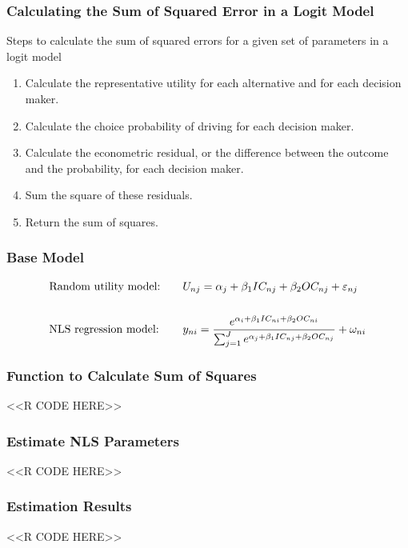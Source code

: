 \documentclass{beamer}
\begin{document}
\begin{frame}\frametitle{Calculating the Sum of Squared Error in a Logit Model}
    Steps to calculate the sum of squared errors for a given set of parameters in a logit model
    \begin{enumerate}
        \item Calculate the representative utility for each alternative and for each decision maker.
        \item Calculate the choice probability of driving for each decision maker.
        \item Calculate the econometric residual, or the difference between the outcome and the probability, for each decision maker.
        \item Sum the square of these residuals.
        \item Return the sum of squares.
    \end{enumerate}
\end{frame}

\begin{frame}\frametitle{Base Model}
    \begin{alignat*}{2}
    &\text{Random utility model:} \quad &&U_{nj} = \alpha_j + \beta_1 IC_{nj} + \beta_2 OC_{nj} + \varepsilon_{nj} \\
    \intertext{}
    &\text{NLS regression model:} \quad &&y_{ni} =  \frac{e^{\alpha_i + \beta_1 IC_{ni} + \beta_2 OC_{ni}}}{\sum_{j = 1}^J e^{\alpha_j + \beta_1 IC_{nj} + \beta_2 OC_{nj}}} + \omega_{ni}
    \end{alignat*}
\end{frame}

\begin{frame}[fragile]\frametitle{Function to Calculate Sum of Squares}
    \vspace{1ex}
    <<R CODE HERE>>
\end{frame}

\begin{frame}[fragile]\frametitle{Estimate NLS Parameters}
    <<R CODE HERE>>
\end{frame}

\begin{frame}[fragile]\frametitle{Estimation Results}
    <<R CODE HERE>>
\end{frame}
\end{document}
